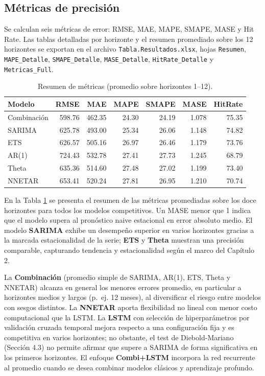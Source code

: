 \documentclass[
  12pt, a4paper, oneside]{article}
\begin{document}
\subsection{Métricas de precisión}\label{muxe9tricas-de-precisiuxf3n}

Se calculan seis métricas de error: RMSE, MAE, MAPE, SMAPE, MASE y Hit Rate. Las tablas detalladas por horizonte y el resumen promediado sobre los 12 horizontes se exportan en el archivo \texttt{Tabla.Resultados.xlsx}, hojas \texttt{Resumen}, \texttt{MAPE\_Detalle}, \texttt{SMAPE\_Detalle}, \texttt{MASE\_Detalle}, \texttt{HitRate\_Detalle} y \texttt{Metricas\_Full}.

\begin{table}

\caption{\label{tab:tab-resumen}Resumen de métricas (promedio sobre horizontes 1--12).}
\centering
\begin{tabular}[t]{lrrrrrr}
\toprule
Modelo & RMSE & MAE & MAPE & SMAPE & MASE & HitRate\\
\midrule
Combinación & 598.76 & 462.35 & 24.30 & 24.19 & 1.078 & 75.35\\
SARIMA & 625.78 & 493.00 & 25.34 & 26.06 & 1.148 & 74.82\\
ETS & 626.57 & 505.16 & 26.97 & 26.46 & 1.179 & 73.76\\
AR(1) & 724.43 & 532.78 & 27.41 & 27.73 & 1.245 & 68.79\\
Theta & 635.36 & 514.60 & 27.48 & 27.02 & 1.199 & 73.40\\
\addlinespace
NNETAR & 653.41 & 520.24 & 27.81 & 26.95 & 1.210 & 70.74\\
\bottomrule
\end{tabular}
\end{table}

En la Tabla \ref{tab:tab-resumen} se presenta el resumen de las métricas promediadas sobre los doce horizontes para todos los modelos competitivos. Un MASE menor que 1 indica que el modelo supera al pronóstico naive estacional en error absoluto medio. El modelo \textbf{SARIMA} exhibe un desempeño superior en varios horizontes gracias a la marcada estacionalidad de la serie; \textbf{ETS} y \textbf{Theta} muestran una precisión comparable, capturando tendencia y estacionalidad según el marco del Capítulo 2.

La \textbf{Combinación} (promedio simple de SARIMA, AR(1), ETS, Theta y NNETAR) alcanza en general los menores errores promedio, en particular a horizontes medios y largos (p.~ej. 12 meses), al diversificar el riesgo entre modelos con sesgos distintos. La \textbf{NNETAR} aporta flexibilidad no lineal con menor costo computacional que la LSTM. La \textbf{LSTM} con selección de hiperparámetros por validación cruzada temporal mejora respecto a una configuración fija y es competitiva en varios horizontes; no obstante, el test de Diebold-Mariano (Sección 4.3) no permite afirmar que supere a SARIMA de forma significativa en los primeros horizontes. El enfoque \textbf{Combi+LSTM} incorpora la red recurrente al promedio cuando se desea combinar modelos clásicos y aprendizaje profundo.
\end{document}
